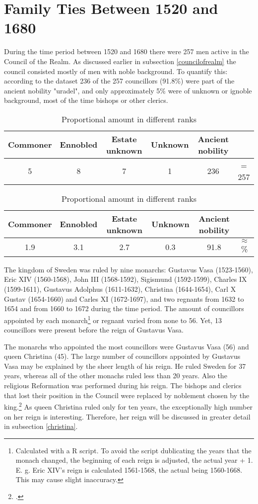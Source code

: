 \section{Family Ties Between 1520 and 1680}
During the time period between 1520 and 1680 there were 257 men active in the Council of the Realm. As discussed earlier in subsection \ref{councilofrealm} the council consisted mostly of men with noble background. To quantify this: according to the dataset 236 of the 257 councillors (91.8\%) were part of the ancient nobility "uradel", and only approximately 5\% were of unknown or ignoble background, most of the time bishops or other clerics.  

\begin{table}
	\caption{Absolute amount in different ranks}
	\centering
	\begin{tabular}{cccccc}
		\hline
		Commoner & Ennobled & Estate unknown & Unknown & Ancient nobility & \\
		\hline
		5 & 8 & 7 & 1 & 236 & = 257 \\
		\hline
	\end{tabular}
	\caption{Proportional amount in different ranks}
	\centering
	\begin{tabular}{cccccc}
		\hline
	    Commoner & Ennobled & Estate unknown & Unknown & Ancient nobility & \\
	    \hline
	    1.9 & 3.1 & 2.7 & 0.3 & 91.8 & $\approx$ \% \\
	\end{tabular}
\end{table}

The kingdom of Sweden was ruled by nine monarchs: Gustavus Vasa (1523-1560), Eric XIV (1560-1568), John III (1568-1592), Sigismund (1592-1599), Charles IX (1599-1611), Gustavus Adolphus (1611-1632), Christina (1644-1654), Carl X Gustav (1654-1660) and Carles XI (1672-1697), and two regnants from 1632 to 1654 and from 1660 to 1672 during the time period. The amount of councillors appointed by each monarch\footnote{Calculated with a R script. To avoid the script dublicating the years that the monach changed, the beginning of each reign is adjusted, the actual year + 1. E. g. Eric XIV's reign is calculated 1561-1568, the actual being 1560-1668. This may cause slight inaccuracy.} or regnant varied from none to 56. Yet, 13 councillors were present before the reign of Gustavus Vasa.

The monarchs who appointed the most councillors were Gustavus Vasa (56) and queen Christina (45). The large number of councillors appointed by Gustavus Vasa may be explained by the sheer length of his reign. He ruled Sweden for 37 years, whereas all of the other monachs ruled less than 20 years. Also the religious Reformation was performed during his reign. The bishops and clerics that lost their position in the Council were replaced by noblement chosen by the king.\footcite[TODO]{pSuurvalta} As queen Christina ruled only for ten years, the exceptionally high number on her reign is interesting. Therefore, her reign will be discussed in greater detail in subsection \ref{christina}. 

